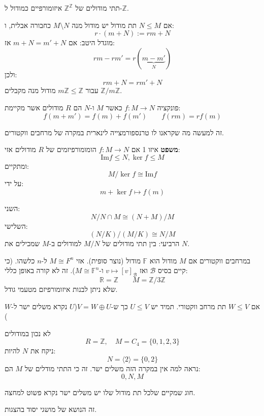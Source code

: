 \documentclass{tstextbook}
\begin{document}
\begin{proposition}
תתי מודולים של \(\mathbb{Z}^{\mathbb{Z}}\) איזומורפיים כמודול ל-\(\mathbb{Z}\).

\end{proposition}
\begin{definition}
אם \(N\leq M\) תת מודול יש מודול מנה \(M \setminus N\) כחבורה אבלית, ו:
$$r\cdot (m+N):= r m +N$$
מוגדל היטב:
אם \(m+N=m'+N\) אז:
$$r m - r m' = r(\underbrace{ m - m' }_{ N })$$
ולכן:
$$r m +N= r m' +N$$
עבור \(m\mathbb{Z}\leq \mathbb{Z}\) מודול מנה מקבלים \(\mathbb{Z} / m\mathbb{Z}\).

\end{definition}
\begin{definition}
פונקציה \(f:M\to N\) כאשר \(M\) ו-\(N\) הם \(R\) מודולים אשר מקיימת:
$$f(m+m')=f(m)+f(m')\qquad f(r m)=rf(m)$$

\end{definition}
\begin{remark}
זה למעשה מה שקראנו לו טרנספורמצייה לינארית במקרה של מרחבים ווקטורים.

\end{remark}
\textbf{משפט} איזו 1
 אם \(f:M\to N\) הומומורפיזמים של \(R\) מודולים אזי:
$$\mathrm{Im}f\leq N, \ker f\leq M$$
ומתקיים:
$$M / \ker f\cong  \mathrm{Im} f$$
על ידי:
$$m+\ker f\mapsto f(m)$$

\begin{theorem}[איזו 2,3,4]
השני:
$$N / N\cap  M \cong  (N+M) / M$$
השלישי:
$$(N / K )/(M / K)\cong N / M$$
הרביעי:
בין תתי מודולים של \(M / N\) למודולים ב-\(M\) שמכילים את \(N\).

\end{theorem}
במרחבים ווקטורים אם \(M\) מודול הוא \(\mathbb{F}\) מודול (נוצר סופית). אזי \(M\cong F^{n}\) ל-\(n\) כלשהו.
(כי קיים בסיס \(\mathcal{B}\) ואז \(v\mapsto [v]_{\mathcal{B}}\) ו-\(M\cong \mathbb{F}^{n}\)).
זה לא קורה באופן כללי:
$$\mathbb{R} =\mathbb{Z}\qquad  M= \mathbb{Z} / 3 \mathbb{Z}$$
שלא ניתן לבנות איזומורפיזם מטעמי גודל.

אם \(W\leq V\) תת מרחב ווקטורי. תמיד יש \(U\leq V\) כך ש-\(V=W \oplus U\)(\(U\) נקרא משלים ישר ל-\(W\))

לא נכון במודולים
$$R=\mathbb{Z},\quad M=C_{4}=\{ 0,1,2,3 \}$$
ניקח את \(N\) להיות:
$$N=\langle 2 \rangle =\{ 0,2 \}$$
נראה למה אין במקרה הזה משלים ישר. זה כי התתי מודלים של \(M\) הם:
$$0,N,M$$

חוג שמקיים שלכל תת מודול שלו יש משלים ישר נקרא פשוט למחצה.

זה הנושא של מושגי יסוד בהצגות.
\end{document}
